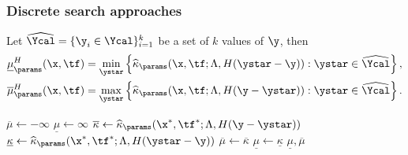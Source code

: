 \subsubsection{Discrete search approaches}
Let $\widehat{\Ycal}=\{\y_i \in \Ycal\}_{i=1}^{k}$ be a set of $k$ values of $\y$, then
\begin{equation*}
    \begin{split}
         \underline{\mu}_{\params}^{H}(\x, \tf) &= \min_{\ystar} \left\{ \widehat{\kappa}_{\params}(\x, \tf; \Lambda, H(\ystar - \y)): \ystar \in \widehat{\Ycal} \right\}, \\
         \overline{\mu}_{\params}^{H}(\x, \tf) &= \max_{\ystar} \left\{ \widehat{\kappa}_{\params}(\x, \tf; \Lambda, H(\y - \ystar)): \ystar \in \widehat{\Ycal} \right\}.
    \end{split}
\end{equation*}

\begin{algorithm}
    \caption{Grid Search Interval Optimizer}
    \label{alg:grid-search}
    \begin{algorithmic}[1]
            \State $\overline{\mu} \gets -\infty$
            \State $\underline{\mu} \gets \infty$
            \For{$\ystar \in \widehat{\Ycal}$}
                \State $\overline{\kappa} \gets \widehat{\kappa}_{\params}(\x^{*}, \tf^{*}; \Lambda, H(\y - \ystar))$
                \State $\underline{\kappa} \gets \widehat{\kappa}_{\params}(\x^{*}, \tf^{*}; \Lambda, H(\ystar-\y))$
                \If{$\overline{\kappa} > \overline{\mu}$}
                    \State $\overline{\mu}\gets \overline{\kappa}$
                \EndIf
                \If{$\underline{\kappa} < \underline{\mu}$}
                    \State $\underline{\mu} \gets \underline{\kappa}$
                \EndIf
            \EndFor
            \State \Return $\underline{\mu}, \overline{\mu}$
        \EndFunction
    \end{algorithmic}
\end{algorithm}

